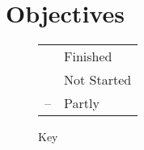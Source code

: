 \section{Objectives}

\begin{figure}[h!]
	\caption*{Key}
	\begin{center}
		\begin{tabular}{rl}
		\Checkmark & Finished\\
		\XSolidBrush & Not Started\\
		–  &  Partly\\
		\end{tabular}
	\end{center}
\end{figure}

\label{Objectives}
